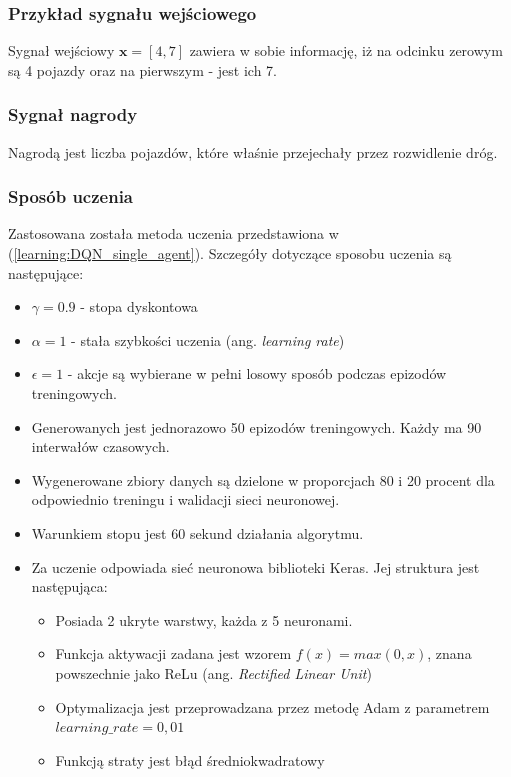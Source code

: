 \documentclass[12pt]{book}
\theoremstyle{plain}
\newcommand{\myref}[1]{(\ref{#1})}
\begin{document}
\subsubsection*{Przykład sygnału wejściowego}
Sygnał wejściowy $ \textbf{x}=[4,7] $ zawiera w sobie informację, iż na odcinku zerowym są 4 pojazdy oraz na pierwszym - jest ich 7. 
\subsubsection*{Sygnał nagrody}
Nagrodą jest liczba pojazdów, które właśnie przejechały przez rozwidlenie dróg.
\subsubsection*{Sposób uczenia}
Zastosowana została metoda uczenia przedstawiona w \myref{learning:DQN_single_agent}. Szczegóły dotyczące sposobu uczenia są następujące:
\begin{itemize}
	\item $\gamma = 0.9$ - stopa dyskontowa
	\item $\alpha = 1$ - stała szybkości uczenia (ang. \emph{learning rate})
	\item $\epsilon = 1$ - akcje są wybierane w pełni losowy sposób podczas epizodów treningowych.
	\item Generowanych jest jednorazowo 50 epizodów treningowych. Każdy ma 90 interwałów czasowych.
	\item Wygenerowane zbiory danych są dzielone w proporcjach 80 i 20 procent dla odpowiednio treningu i walidacji sieci neuronowej.
	\item Warunkiem stopu jest 60 sekund działania algorytmu.
	\item Za uczenie odpowiada sieć neuronowa biblioteki Keras. Jej struktura jest następująca:  
	\begin{itemize}
		\item Posiada 2 ukryte warstwy, każda z 5 neuronami.
		\item Funkcja aktywacji zadana jest wzorem $f(x)=max({0,x})$, znana powszechnie jako ReLu (ang. \emph{Rectified Linear Unit})
		\item Optymalizacja jest przeprowadzana przez metodę Adam \cite{adam} z parametrem $learning\_rate = 0,01$
		\item Funkcją straty jest błąd średniokwadratowy
	\end{itemize}
\end{itemize}

\end{document}
